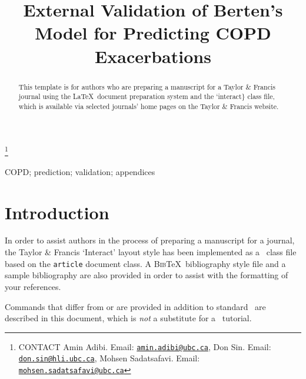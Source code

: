 \documentclass[]{interact}
\theoremstyle{plain}%
\theoremstyle{definition}
\theoremstyle{remark}
\begin{document}

\title{External Validation of Berten's Model for Predicting COPD
Exacerbations}


\author{
}

\thanks{CONTACT Amin
Adibi. Email: \href{mailto:amin.adibi@ubc.ca}{\nolinkurl{amin.adibi@ubc.ca}}, Don
Sin. Email: \href{mailto:don.sin@hli.ubc.ca}{\nolinkurl{don.sin@hli.ubc.ca}}, Mohsen
Sadatsafavi. Email: \href{mailto:mohsen.sadatsafavi@ubc.ca}{\nolinkurl{mohsen.sadatsafavi@ubc.ca}}}

\maketitle

\begin{abstract}
This template is for authors who are preparing a manuscript for a Taylor
\& Francis journal using the \LaTeX~document preparation system and the
`interact\} class file, which is available via selected journals' home
pages on the Taylor \& Francis website.
\end{abstract}

\begin{keywords}
COPD; prediction; validation; appendices
\end{keywords}

\hypertarget{introduction}{%
\section{Introduction}\label{introduction}}

In order to assist authors in the process of preparing a manuscript for
a journal, the Taylor \& Francis `\textsf{Interact}' layout style has
been implemented as a \LaTeXe~class file based on the \texttt{article}
document class. A \textsc{Bib}\TeX~bibliography style file and a sample
bibliography are also provided in order to assist with the formatting of
your references.

Commands that differ from or are provided in addition to standard
\LaTeXe~are described in this document, which is \emph{not} a substitute
for a \LaTeXe~tutorial.
\end{document}

